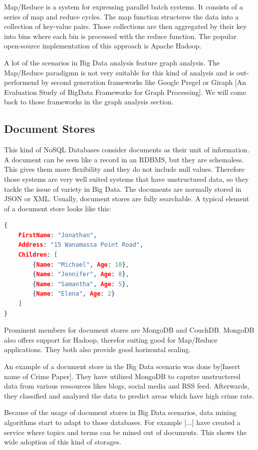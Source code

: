 \documentclass{acm_proc_article-sp}
\begin{document}
Map/Reduce is a system for expressing parallel batch systems. It consists of a series of map and reduce cycles. The map function structeres the data into a collection of key-value pairs. Those collections are then aggregated by their key into bins where each bin is processed with the reduce function. The popular open-source implementation of this approach is Apache Hadoop.

A lot of the scenarios in Big Data analysis feature graph analysis. The Map/Reduce paradigmn is not very suitable for this kind of analysis and is out-performend by second generation frameworks like Google Pregel or Giraph [An Evaluation Study of BigData Frameworks for Graph Processing]. We will come back to those frameworks in the graph analysis section.

\subsection{Document Stores}

This kind of NoSQL Databases consider documents as their unit of information. A
document can be seen like a record in an RDBMS, but they are schemaless. This
gives them more flexibility and they do not include null values. Therefore those systems are very well suited systems that have unstructured data, so they tackle the issue of variety in Big Data.
The documents are normally stored in JSON or XML. Usually, document stores are fully searchable. A typical element of a document store looks
like this:

\begin{lstlisting}[language=json,firstnumber=1]
{
	FirstName: "Jonathan",
	Address: "15 Wanamassa Point Road",
	Children: [
		{Name: "Michael", Age: 10},
		{Name: "Jennifer", Age: 8},
		{Name: "Samantha", Age: 5},
		{Name: "Elena", Age: 2}
	]
}
\end{lstlisting}

Prominent members for document stores are MongoDB and CouchDB. MongoDB also offers support for Hadoop, therefor suiting good for Map/Reduce applications. They both also provide good horizontal scaling.

An example of a document store in the Big Data scenario was done by[Insert name of Crime Paper]. They have utilized MongoDB to caputre unstructered data from various ressources likes blogs, social media and RSS feed. Afterwards, they classified and analyzed the data to predict areas which have high crime rate.

Because of the usage of document stores in Big Data scenarios, data mining algorithms start to adapt to those databases. For example [...] have created a service where topics and terms can be mined out of documents. This shows the wide adoption of this kind of storages.
\end{document}
